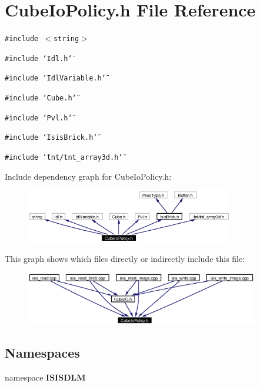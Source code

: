 \section{Cube\-Io\-Policy.h File Reference}
\label{CubeIoPolicy_8h}
{\tt \#include $<$string$>$}\par
{\tt \#include \char`\"{}Idl.h\char`\"{}}\par
{\tt \#include \char`\"{}Idl\-Variable.h\char`\"{}}\par
{\tt \#include \char`\"{}Cube.h\char`\"{}}\par
{\tt \#include \char`\"{}Pvl.h\char`\"{}}\par
{\tt \#include \char`\"{}Isis\-Brick.h\char`\"{}}\par
{\tt \#include \char`\"{}tnt/tnt\_\-array3d.h\char`\"{}}\par


Include dependency graph for Cube\-Io\-Policy.h:\begin{figure}[H]
\begin{center}
\leavevmode
\includegraphics[width=257pt]{CubeIoPolicy_8h__incl}
\end{center}
\end{figure}


This graph shows which files directly or indirectly include this file:\begin{figure}[H]
\begin{center}
\leavevmode
\includegraphics[width=288pt]{CubeIoPolicy_8h__dep__incl}
\end{center}
\end{figure}
\subsection*{Namespaces}
\begin{CompactItemize}
\item 
namespace {\bf ISISDLM}
\end{CompactItemize}
